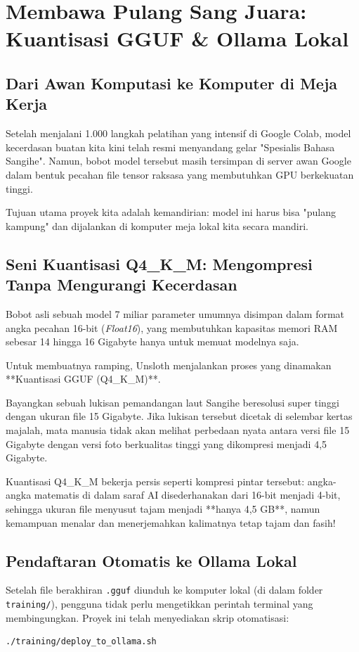 \chapter{Membawa Pulang Sang Juara: Kuantisasi GGUF \& Ollama Lokal}

\section{Dari Awan Komputasi ke Komputer di Meja Kerja}
Setelah menjalani 1.000 langkah pelatihan yang intensif di Google Colab, model kecerdasan buatan kita kini telah resmi menyandang gelar "Spesialis Bahasa Sangihe". Namun, bobot model tersebut masih tersimpan di server awan Google dalam bentuk pecahan file tensor raksasa yang membutuhkan GPU berkekuatan tinggi.

Tujuan utama proyek kita adalah kemandirian: model ini harus bisa "pulang kampung" dan dijalankan di komputer meja lokal kita secara mandiri.

\section{Seni Kuantisasi Q4\_K\_M: Mengompresi Tanpa Mengurangi Kecerdasan}
Bobot asli sebuah model 7 miliar parameter umumnya disimpan dalam format angka pecahan 16-bit (\textit{Float16}), yang membutuhkan kapasitas memori RAM sebesar 14 hingga 16 Gigabyte hanya untuk memuat modelnya saja.

Untuk membuatnya ramping, Unsloth menjalankan proses yang dinamakan **Kuantisasi GGUF (Q4\_K\_M)**.

\begin{infobox}
Bayangkan sebuah lukisan pemandangan laut Sangihe beresolusi super tinggi dengan ukuran file 15 Gigabyte. Jika lukisan tersebut dicetak di selembar kertas majalah, mata manusia tidak akan melihat perbedaan nyata antara versi file 15 Gigabyte dengan versi foto berkualitas tinggi yang dikompresi menjadi 4,5 Gigabyte. 

Kuantisasi Q4\_K\_M bekerja persis seperti kompresi pintar tersebut: angka-angka matematis di dalam saraf AI disederhanakan dari 16-bit menjadi 4-bit, sehingga ukuran file menyusut tajam menjadi **hanya 4,5 GB**, namun kemampuan menalar dan menerjemahkan kalimatnya tetap tajam dan fasih!
\end{infobox}

\section{Pendaftaran Otomatis ke Ollama Lokal}
Setelah file berakhiran \texttt{.gguf} diunduh ke komputer lokal (di dalam folder \texttt{training/}), pengguna tidak perlu mengetikkan perintah terminal yang membingungkan. Proyek ini telah menyediakan skrip otomatisasi:
\begin{lstlisting}[language=bash]
./training/deploy_to_ollama.sh
\end{lstlisting}


